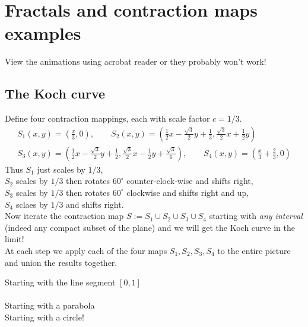 \graphicspath{{lectures/9Fractals/asy/}}

\section*{Fractals and contraction maps examples}

View the animations using acrobat reader or they probably won't work!

\subsection*{The Koch curve}

Define four contraction mappings, each with scale factor $c=1/3$.
\begin{gather*}
S_1(x,y)=\left(\frac x3,0\right),\qquad S_2(x,y)=\left(\frac 12x-\frac{\sqrt 3}2y+\frac 13,\frac{\sqrt 3}2x+\frac 12y\right)\\
S_3(x,y)=\left(\frac 12x-\frac{\sqrt 3}2y+\frac 12,\frac{\sqrt 3}2x-\frac 12y+\frac{\sqrt 3}6\right),\qquad S_4(x,y)=\left(\frac x3+\frac 23,0\right)
\end{gather*}
Thus $S_1$ just scales by $1/3$,\\
$S_2$ scales by $1/3$ then rotates $60^\circ$ counter-clock-wise and shifts right,\\
$S_3$ scales by $1/3$ then rotates $60^\circ$ clockwise and shifts right and up,\\
$S_4$ sclaes by $1/3$ and shifts right.\\

Now iterate the contraction map $S:=S_1\cup S_2\cup S_3\cup S_4$ starting with \emph{any interval} (indeed any compact subset of the plane) and we will get the Koch curve in the limit!\\
At each step we apply each of the four maps $S_1,S_2,S_3,S_4$ to the entire picture and union the results together.

\begin{center}
Starting with the line segment $[0,1]$\\
\\[70pt]
Starting with a parabola\\
\newpage
Starting with a circle!\\
\end{center}


